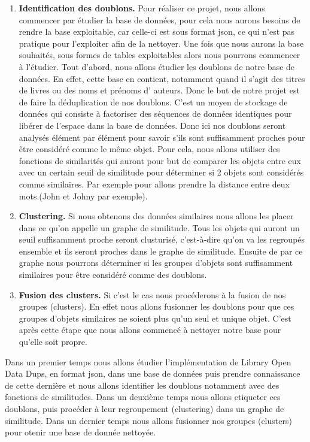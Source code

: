 \documentclass[12pt, a4paper]{article}
\begin{document}
\begin{enumerate}
\item \textbf{Identification des doublons.} Pour réaliser ce projet, nous allons commencer par étudier la base de données, pour cela nous aurons besoins de rendre la base exploitable, car celle-ci est sous format json, ce qui n’est pas pratique pour l’exploiter afin de la nettoyer. Une fois que nous aurons la base souhaités, sous formes de tables exploitables alors nous pourrons commencer à l’étudier.
Tout d’abord, nous allons  étudier les doublons de notre base de données. En effet, cette base en contient, notamment quand il s'agit des titres de livres ou des noms et prénoms d' auteurs. Donc le but de notre projet est de faire la déduplication de nos doublons. C’est un moyen de stockage de données qui consiste à  factoriser des séquences de données identiques pour libérer de l’espace dans la base de données. Donc ici nos doublons seront analysés élément par élément pour savoir s’ils sont suffisamment proches pour être considéré comme le même objet.
Pour cela, nous allons utiliser des fonctions de similarités qui auront pour but de comparer les objets entre eux avec un certain seuil de similitude pour déterminer si 2 objets sont considérés comme similaires. Par exemple pour allons prendre la distance entre deux mots.(John et Johny par exemple).



\item \textbf{Clustering.}
Si nous obtenons des données similaires nous allons les placer dans ce qu’on appelle un graphe de similitude. Tous les objets qui auront un seuil suffisamment proche seront clusturisé, c’est-à-dire qu’on va les regroupés ensemble et ils seront proches dans le graphe de similitude. Ensuite de par ce  graphe nous pourrons déterminer si les groupes d’objets sont suffisamment similaires pour être considéré comme des doublons.


\item \textbf{Fusion des clusters.} Si c’est le cas nous procéderons à la fusion de nos groupes (clusters). En effet nous allons fusionner les doublons pour que ces groupes d’objets similaires ne soient plus qu’un seul et unique objet. C'est après cette étape que nous allons commencé à nettoyer notre base pour qu'elle soit propre. 


\end{enumerate}


Dans un premier temps nous allons étudier l'implémentation de Library Open Data Dups, en format json, dans une base de données puis prendre connaissance de cette dernière et nous allons identifier les doublons notamment avec des fonctions de similitudes.
Dans un deuxième temps nous allons etiqueter ces doublons, puis procéder à leur regroupement (clustering) dans un graphe de similitude.
Dans un dernier temps nous allons fusionner nos groupes (clusters) pour otenir une base de donnée nettoyée.

\cite{Fan15}
\cite{SuNo00}



\end{document}
